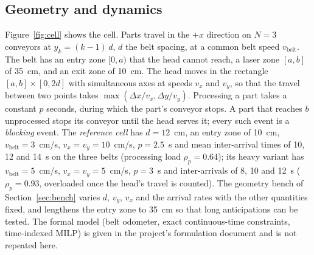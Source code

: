 \documentclass[11pt,a4paper]{article}
\newcommand{\vb}{v_{\mathrm{belt}}}
\begin{document}
\subsection{Geometry and dynamics}
Figure~\ref{fig:cell} shows the cell. Parts travel in the $+x$ direction on $N=3$
conveyors at $y_k=(k-1)\,d$, $d$ the belt spacing, at a common belt speed $\vb$. The belt
has an entry zone $[0,a)$ that the head cannot reach, a laser zone $[a,b]$ of 35~cm, and
an exit zone of 10~cm. The head moves in the rectangle $[a,b]\times[0,2d]$ with
simultaneous axes at speeds $v_x$ and $v_y$, so that the travel between two points takes
$\max(\Delta x/v_x,\Delta y/v_y)$. Processing a part takes a constant $p$ seconds, during
which the part's conveyor stops. A part that reaches $b$ unprocessed stops its conveyor
until the head serves it; every such event is a \emph{blocking} event. The \emph{reference
cell} has $d=12$~cm, an entry zone of 10~cm, $\vb=3$~cm/s, $v_x=v_y=10$~cm/s, $p=2.5$~s
and mean inter-arrival times of 10, 12 and 14~s on the three belts (processing load
$\rho_p=0.64$); its heavy variant has $\vb=5$~cm/s, $v_x=v_y=5$~cm/s, $p=3$~s and
inter-arrivals of 8, 10 and 12~s ($\rho_p=0.93$, overloaded once the head's travel is
counted). The geometry bench of Section~\ref{sec:bench} varies $d$, $v_y$, $v_x$ and the
arrival rates with the other quantities fixed, and lengthens the entry zone to 35~cm so
that long anticipations can be tested. The formal model (belt odometer, exact
continuous-time constraints, time-indexed MILP) is given in the project's formulation
document and is not repeated here.
\end{document}
